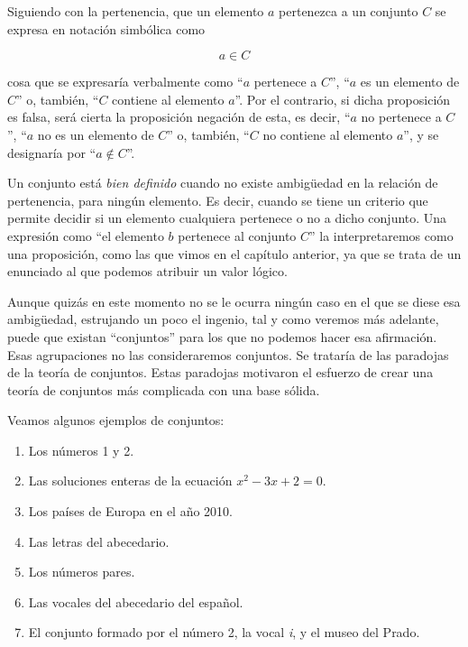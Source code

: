 Siguiendo con la pertenencia, que un elemento $a$ pertenezca a un conjunto
$C$ se expresa en notación simbólica como

$$ a \in C $$

\noindent cosa que se expresaría verbalmente como ``$a$ pertenece a $C$'',
``$a$ es un elemento de $C$'' o, también, ``$C$ contiene al elemento $a$''.
Por el contrario, si dicha proposición es falsa, será cierta la proposición
negación de esta, es decir, ``$a$ no pertenece a $C$'', ``$a$ no es un
elemento de $C$'' o, también, ``$C$ no contiene al elemento $a$'', y se
designaría por ``$a \notin C$''.

Un conjunto está \emph{bien definido} cuando no existe ambigüedad en la
relación de pertenencia, para ningún elemento. Es decir, cuando se tiene un
criterio que permite decidir si un elemento cualquiera pertenece o no a
dicho conjunto. Una expresión como ``el elemento $b$ pertenece al conjunto
$C$'' la interpretaremos como una proposición, como las que vimos en el
capítulo anterior, ya que se trata de un enunciado al que podemos atribuir
un valor lógico.

Aunque quizás en este momento no se le ocurra ningún caso en el que se diese
esa ambigüedad, estrujando un poco el ingenio, tal y como veremos más
adelante, puede que existan ``conjuntos'' para los que no podemos hacer esa
afirmación. Esas agrupaciones no las consideraremos conjuntos. Se trataría
de las paradojas de la teoría de conjuntos. Estas paradojas motivaron el
esfuerzo de crear una teoría de conjuntos más complicada con una base
sólida.

\begin{example}\label{ejemplo:conjuntos_01}
  Veamos algunos ejemplos de conjuntos:

  \begin{enumerate}
    \item Los números 1 y 2.
    \item Las soluciones enteras de la ecuación $x^2 - 3x + 2 = 0$.
    \item Los países de Europa en el año 2010.
    \item Las letras del abecedario.
    \item Los números pares.
    \item Las vocales del abecedario del español.
    \item El conjunto formado por el número 2, la vocal \emph{i}, y el museo
      del Prado.
  \end{enumerate}
\end{example}





